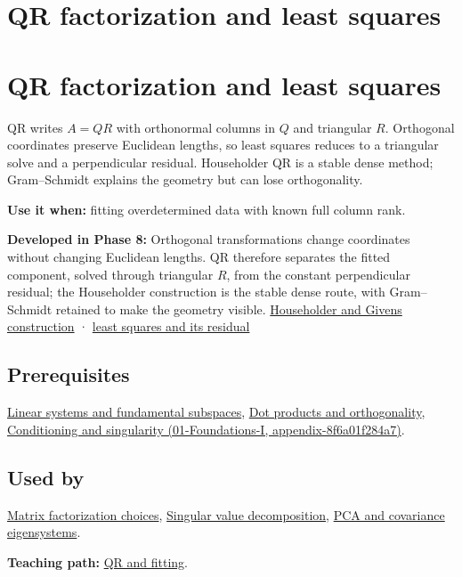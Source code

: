 \hypertarget{appendix-c3421e6b4f2c}{}
\section*{QR factorization and least squares}
\section{QR factorization and least squares}\label{qr-factorization-and-least-squares}

QR writes \(A=QR\) with orthonormal columns in \(Q\) and triangular \(R\). Orthogonal coordinates preserve Euclidean lengths, so least squares reduces to a triangular solve and a perpendicular residual. Householder QR is a stable dense method; Gram--Schmidt explains the geometry but can lose orthogonality.

\textbf{Use it when:} fitting overdetermined data with known full column rank.

\textbf{Developed in Phase 8:} Orthogonal transformations change coordinates without changing Euclidean lengths. QR therefore separates the fitted component, solved through triangular \(R\), from the constant perpendicular residual; the Householder construction is the stable dense route, with Gram--Schmidt retained to make the geometry visible. \href{Continuous\%20Notes/Computing\%20Foundations\%20-\%20From\%20Bits\%20to\%20C++\%20and\%20Systems\%20APIs\#Reflections\%20and\%20plane\%20rotations\%20build\%20QR\%20without\%20losing\%20lengths}{Householder and Givens construction} · \href{Continuous\%20Notes/Computing\%20Foundations\%20-\%20From\%20Bits\%20to\%20C++\%20and\%20Systems\%20APIs\#QR\%20turns\%20least\%20squares\%20into\%20a\%20triangular\%20solve\%20plus\%20an\%20irreducible\%20residual}{least squares and its residual}

\subsection{Prerequisites}\label{prerequisites}

\hyperref[appendix-8572a4a060c1]{Linear systems and fundamental subspaces}, \hyperref[appendix-8bc4e8fc547c]{Dot products and orthogonality}, \href{}{Conditioning and singularity (01-Foundations-I, appendix-8f6a01f284a7)}.

\subsection{Used by}\label{used-by}

\hyperref[appendix-221a483bec2d]{Matrix factorization choices}, \hyperref[appendix-1fad5e7f36fa]{Singular value decomposition}, \hyperref[appendix-ad175ef3c5bf]{PCA and covariance eigensystems}.

\textbf{Teaching path:} \href{Continuous\%20Notes/Computing\%20Foundations\%20-\%20From\%20Bits\%20to\%20C++\%20and\%20Systems\%20APIs\#Structure\%20makes\%20a\%20decomposition\%20a\%20better\%20tool\%20than\%20generic\%20elimination}{QR and fitting}.
